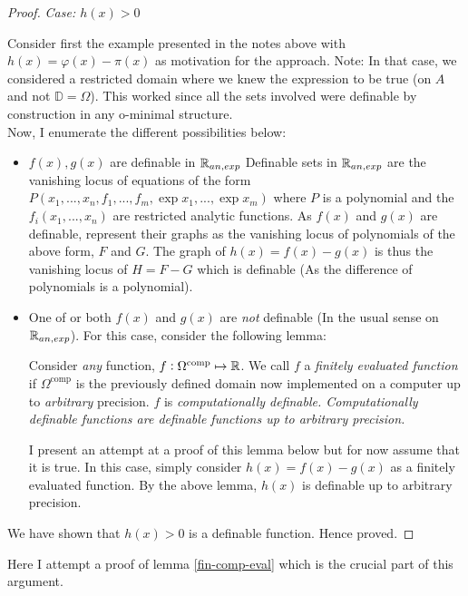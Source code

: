 \begin{definition}
\begin{proof}
    \textit{Case: $h(x) > 0$}
    \par Consider first the example presented in the notes above with $h(x) = \varphi(x) - \pi(x)$ as motivation for the approach. Note: In that case, we considered a restricted domain where we knew the expression to be true (on $A$ and not $\mathbb{D} = \Omega$). This worked since all the sets involved were definable by construction in any o-minimal structure.\\
    Now, I enumerate the different possibilities below:
    \begin{itemize}
        \item $f(x), g(x)$ are definable in $\mathbb{R}_{an,exp}$
        Definable sets in $\mathbb{R}_{an,exp}$ are the vanishing locus of equations of the form 
        $P(x_1, ..., x_n, f_1,..., f_m, \exp{x_1},..., \exp{x_m})$ where $P$ is a polynomial and the $f_i(x_1,...,x_n)$ are restricted analytic functions. As $f(x)$ and $g(x)$ are definable, represent their graphs as the vanishing locus of polynomials of the above form, $F$ and $G$. The graph of $h(x) = f(x) - g(x)$ is thus the vanishing locus of $H = F - G$ which is definable (As the difference of polynomials is a polynomial).
        \item One of or both $f(x)$ and $g(x)$ are \textit{not} definable (In the usual sense on $\mathbb{R}_{an,exp}$).
        For this case, consider the following lemma:

        \begin{lemma}
        \label{fin-comp-eval}
            Consider \textit{any} function, $f:\Omega^\text{comp}\mapsto\mathbb{R}$. We call $f$ a \textit{finitely evaluated function} if $\Omega^\text{comp}$ is the previously defined domain now implemented on a computer up to \textit{arbitrary} precision. $f$ is \textit{computationally definable. Computationally definable functions are definable functions up to arbitrary precision.}
        \end{lemma}
        I present an attempt at a proof of this lemma below but for now assume that it is true. In this case, simply consider $h(x) = f(x) - g(x)$ as a finitely evaluated function. By the above lemma, $h(x)$ is definable up to arbitrary precision.
    \end{itemize}
    We have shown that $h(x) > 0$ is a definable function. Hence proved.
\end{proof}

Here I attempt a proof of lemma \ref{fin-comp-eval} which is the crucial part of this argument.


\end{definition}
